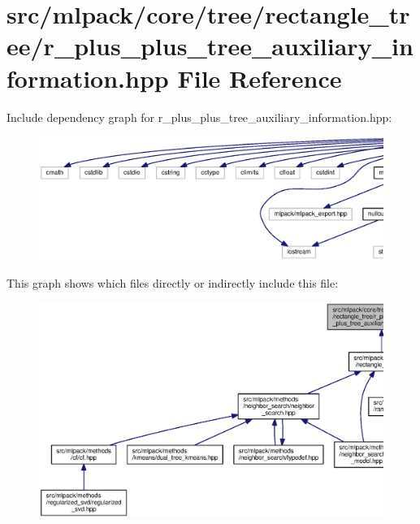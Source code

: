 \section{src/mlpack/core/tree/rectangle\+\_\+tree/r\+\_\+plus\+\_\+plus\+\_\+tree\+\_\+auxiliary\+\_\+information.hpp File Reference}
\label{r__plus__plus__tree__auxiliary__information_8hpp}
Include dependency graph for r\+\_\+plus\+\_\+plus\+\_\+tree\+\_\+auxiliary\+\_\+information.\+hpp\+:
\nopagebreak
\begin{figure}[H]
\begin{center}
\leavevmode
\includegraphics[width=350pt]{r__plus__plus__tree__auxiliary__information_8hpp__incl}
\end{center}
\end{figure}
This graph shows which files directly or indirectly include this file\+:
\nopagebreak
\begin{figure}[H]
\begin{center}
\leavevmode
\includegraphics[width=350pt]{r__plus__plus__tree__auxiliary__information_8hpp__dep__incl}
\end{center}
\end{figure}
